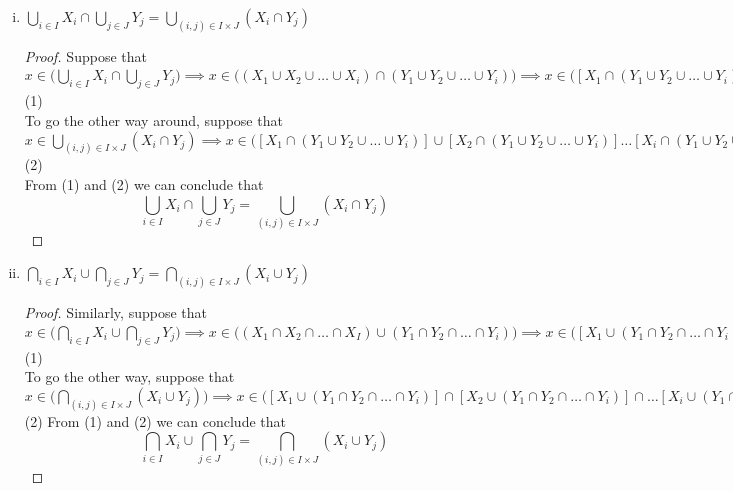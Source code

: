 \documentclass[10pt,letterpaper]{article}
\begin{document}
\begin{enumerate}[(i)]
		\item $\displaystyle{\bigcup_{i \in I}}X_i \cap \displaystyle{\bigcup_{j \in J}}Y_j 
		= \displaystyle{\bigcup_{(i, j) \in I \times J}}(X_i \cap Y_j)$ 
\begin{proof}
	Suppose that $x \in \bigg(\displaystyle{\bigcup_{i \in I}}X_i \cap \displaystyle{\bigcup_{j \in J}}Y_j\bigg)
		\implies x \in
		\bigg((X_1 \cup X_2 \cup \ldots \cup X_i) \cap (Y_1 \cup Y_2 \cup \ldots \cup Y_i)\bigg)
		\implies x \in
		\bigg([X_1 \cap (Y_1 \cup Y_2 \cup \ldots \cup Y_i)] \cup [X_2 \cap (Y_1 \cup Y_2 \cup \ldots \cup Y_i)] 
		\ldots [X_i \cap (Y_1 \cup Y_2 \cup \ldots \cup Y_i)] \bigg) \implies
		x \in \displaystyle{\bigcup_{(i, j) \in I \times J}}(X_i \cap Y_j) 	
		$ (1) \\
		To go the other way around, suppose that $x \in \displaystyle{\bigcup_{(i, j) \in I \times J}}(X_i \cap Y_j) 
		\implies x \in
		\bigg([X_1 \cap (Y_1 \cup Y_2 \cup \ldots \cup Y_i)] \cup [X_2 \cap (Y_1 \cup Y_2 \cup \ldots \cup Y_i)] 
		\ldots [X_i \cap (Y_1 \cup Y_2 \cup \ldots \cup Y_i)] \bigg) \implies 
		x \in \bigg(\displaystyle{\bigcup_{i \in I}}X_i \cap \displaystyle{\bigcup_{j \in J}}Y_j\bigg) 		
		$ (2) \\
		From (1) and (2) we can conclude that 
		$$\displaystyle{\bigcup_{i \in I}}X_i \cap \displaystyle{\bigcup_{j \in J}}Y_j 
		= \displaystyle{\bigcup_{(i, j) \in I \times J}}(X_i \cap Y_j)$$
\end{proof}		
		
		\item $\displaystyle{\bigcap_{i \in I}}X_i \cup \displaystyle{\bigcap_{j \in J}}Y_j 
		= \displaystyle{\bigcap_{(i, j) \in I \times J}}(X_i \cup Y_j)$ 
\begin{proof}
	Similarly, suppose that $x \in \bigg(\displaystyle{\bigcap_{i \in I}}X_i \cup \displaystyle{\bigcap_{j \in J}}Y_j\bigg)
		\implies x \in \bigg((X_1 \cap X_2 \cap \ldots \cap X_I) \cup (Y_1 \cap Y_2 \cap \ldots \cap Y_i)\bigg)
		\implies x \in
		\bigg(
		[X_1 \cup (Y_1 \cap Y_2 \cap \ldots \cap Y_i)] \cap  		
		[X_2 \cup (Y_1 \cap Y_2 \cap \ldots \cap Y_i)] \cap
		\ldots
		[X_i \cup (Y_1 \cap Y_2 \cap \ldots \cap Y_i)]
		\bigg) \implies 
		x \in \bigg(\displaystyle{\bigcap_{(i, j) \in I \times J}}(X_i \cup Y_j)\bigg)
		$ (1) \\
		To go the other way, suppose that $x \in \bigg(\displaystyle{\bigcap_{(i, j) \in I \times J}}(X_i \cup Y_j)\bigg)
		\implies  
		x \in
		\bigg(
		[X_1 \cup (Y_1 \cap Y_2 \cap \ldots \cap Y_i)] \cap  		
		[X_2 \cup (Y_1 \cap Y_2 \cap \ldots \cap Y_i)] \cap
		\ldots
		[X_i \cup (Y_1 \cap Y_2 \cap \ldots \cap Y_i)]
		\bigg)
		\implies x \in \bigg((X_1 \cap X_2 \cap \ldots \cap X_I) \cup (Y_1 \cap Y_2 \cap \ldots \cap Y_i)\bigg)
		\implies x \in \bigg(\displaystyle{\bigcap_{i \in I}}X_i \cup \displaystyle{\bigcap_{j \in J}}Y_j\bigg)$ (2)
		From (1) and (2) we can conclude that
		$$\displaystyle{\bigcap_{i \in I}}X_i \cup \displaystyle{\bigcap_{j \in J}}Y_j 
		= \displaystyle{\bigcap_{(i, j) \in I \times J}}(X_i \cup Y_j)$$
\end{proof}
	\end{enumerate}
	
\end{document}
